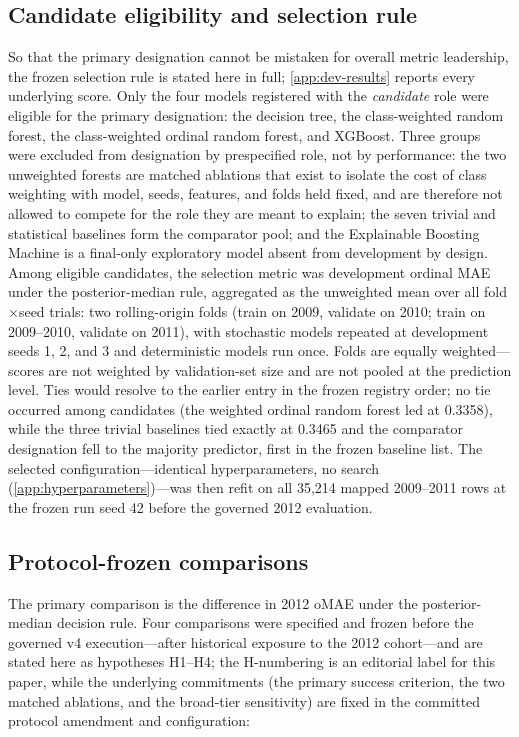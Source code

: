 \documentclass[11pt,letterpaper]{article}
\newcommand{\ORF}{ordinal random forest}
\begin{document}
\subsection{Candidate eligibility and selection rule}
\label{sec:selection}
So that the primary designation cannot be mistaken for overall metric leadership, the frozen selection rule is stated here in full; \cref{app:dev-results} reports every underlying score. Only the four models registered with the \emph{candidate} role were eligible for the primary designation: the decision tree, the class-weighted random forest, the class-weighted \ORF{}, and XGBoost. Three groups were excluded from designation by prespecified role, not by performance: the two unweighted forests are matched ablations that exist to isolate the cost of class weighting with model, seeds, features, and folds held fixed, and are therefore not allowed to compete for the role they are meant to explain; the seven trivial and statistical baselines form the comparator pool; and the Explainable Boosting Machine is a final-only exploratory model absent from development by design. Among eligible candidates, the selection metric was development ordinal MAE under the posterior-median rule, aggregated as the unweighted mean over all fold$\times$seed trials: two rolling-origin folds (train on 2009, validate on 2010; train on 2009--2010, validate on 2011), with stochastic models repeated at development seeds 1, 2, and 3 and deterministic models run once. Folds are equally weighted---scores are not weighted by validation-set size and are not pooled at the prediction level. Ties would resolve to the earlier entry in the frozen registry order; no tie occurred among candidates (the weighted \ORF{} led at 0.3358), while the three trivial baselines tied exactly at 0.3465 and the comparator designation fell to the majority predictor, first in the frozen baseline list. The selected configuration---identical hyperparameters, no search (\cref{app:hyperparameters})---was then refit on all 35,214 mapped 2009--2011 rows at the frozen run seed 42 before the governed 2012 evaluation.

\subsection{Protocol-frozen comparisons}
The primary comparison is the difference in 2012 oMAE under the posterior-median decision rule. Four comparisons were specified and frozen before the governed v4 execution---after historical exposure to the 2012 cohort---and are stated here as hypotheses H1--H4; the H-numbering is an editorial label for this paper, while the underlying commitments (the primary success criterion, the two matched ablations, and the broad-tier sensitivity) are fixed in the committed protocol amendment and configuration:
\end{document}
